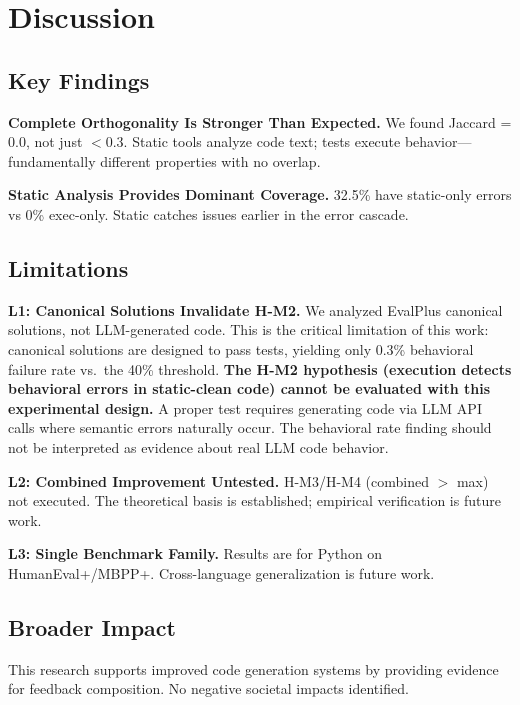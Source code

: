 \section{Discussion}
\label{sec:discussion}

\subsection{Key Findings}

\textbf{Complete Orthogonality Is Stronger Than Expected.} We found Jaccard = 0.0, not just $< 0.3$. Static tools analyze code text; tests execute behavior---fundamentally different properties with no overlap.

\textbf{Static Analysis Provides Dominant Coverage.} 32.5\% have static-only errors vs 0\% exec-only. Static catches issues earlier in the error cascade.

\subsection{Limitations}

\textbf{L1: Canonical Solutions Invalidate H-M2.} We analyzed EvalPlus canonical solutions, not LLM-generated code. This is the critical limitation of this work: canonical solutions are designed to pass tests, yielding only 0.3\% behavioral failure rate vs.\ the 40\% threshold. \textbf{The H-M2 hypothesis (execution detects behavioral errors in static-clean code) cannot be evaluated with this experimental design.} A proper test requires generating code via LLM API calls where semantic errors naturally occur. The behavioral rate finding should not be interpreted as evidence about real LLM code behavior.

\textbf{L2: Combined Improvement Untested.} H-M3/H-M4 (combined $>$ max) not executed. The theoretical basis is established; empirical verification is future work.

\textbf{L3: Single Benchmark Family.} Results are for Python on HumanEval+/MBPP+. Cross-language generalization is future work.

\subsection{Broader Impact}

This research supports improved code generation systems by providing evidence for feedback composition. No negative societal impacts identified.
